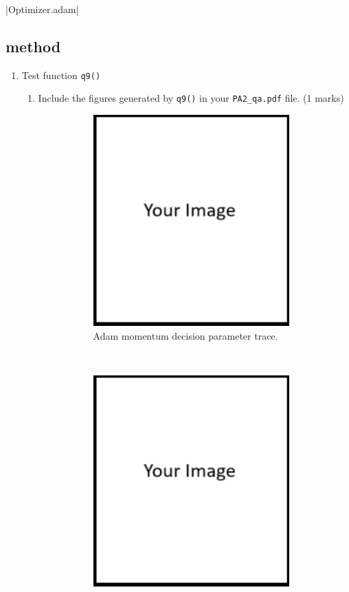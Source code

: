 \documentclass{article}
\theoremstyle{definition}
\begin{document}
\newpage
{}|Optimizer.adam|
\subsection{ method}\label{adam}
\begin{enumerate}[label=\ref{adam}.\alph*]
	\item Test function \verb|q9()|
	\begin{enumerate}[label=1.3.a.\roman*]
		\item Include the figures generated by \verb|q9()| in your \verb|PA2_qa.pdf| file. (1 marks)
		\begin{figure}[h]
			\centering
			\begin{subfigure}[t]{0.5\textwidth}
				\centering
				\includegraphics[height=3.2in]{image.png}
				\caption{Adam momentum decision parameter trace.}
			\end{subfigure}%
			~ 
			\begin{subfigure}[t]{0.5\textwidth}
				\centering
				\includegraphics[height=3.2in]{image.png}

\end{subfigure}
\end{figure}
\end{enumerate}
\end{enumerate}
\end{document}
